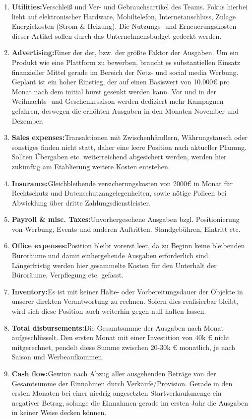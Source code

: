 \documentclass[11pt,a4paper]{report}
\begin{document}
\begin{enumerate}
    \item \textbf{Utilities:}\quad Verschleiß und Ver- und Gebrauchsartikel des Teams. Fokus hierbei lieht auf elektronischer Hardware, Mobiltelefon, Internetanschluss, Zulage Energiekosten (Strom \& Heizung). Die Nutzungs- und Erneuerungskosten dieser Artikel sollen durch das Unternehmensbudget gedeckt werden.
    \item \textbf{Advertising:}\quad Einer der der, bzw. der größte Faktor der Ausgaben. Um ein Produkt wie eine Plattform zu bewerben, braucht es substantiellen Einsatz finanzieller Mittel gerade im Bereich der Netz- und social media Werbung. Geplant ist ein hoher Einstieg, der auf einen Basiswert von 10.000€ pro Monat nach dem initial burst gesenkt werden kann. Vor und in der Weihnachts- und Geschenkesaison werden dediziert mehr Kampagnen gefahren, deswegen die erhöhten Ausgaben in den Monaten November und Dezember.
    \item \textbf{Sales expenses:}\quad Transaktionen mit Zwischenhändlern, Währungstausch oder sonstiges finden nicht statt, daher eine leere Position nach aktueller Planung. Sollten Übergaben etc. weiterreichend abgesichert werden, werden hier zukünftig am Etablierung weitere Kosten entstehen.
    \item \textbf{Insurance:}\quad Gleichbleibende versicherungskosten von 2000€ in Monat für Rechtschutz und Datenschutzangelegenheiten, sowie nötige Policen bei Abwicklung über dritte Zahlungsdienstleister.
    \item \textbf{Payroll \& misc. Taxes:}\quad Unvorhergesehene Ausgaben bzgl. Positionierung von Werbung, Events und anderen Auftritten. Standgebühren, Eintritt etc.
    \item \textbf{Office expenses:}\quad Position bleibt vorerst leer, da zu Beginn keine bleibenden Büroräume und damit einhergehende Ausgaben erforderlich sind. Längerfristig werden hier gesammelte Kosten für den Unterhalt der Büroräume, Verpflegung etc. gefasst.
    \item \textbf{Inventory:}\quad Es ist mit keiner Halte- oder Vorbereitungsdauer der Objekte in unserer direkten Verantwortung zu rechnen. Sofern dies realisierbar bleibt, wird sich diese Position auch weiterhin gegen null halten lassen.
    \item \textbf{Total disbursements:}\quad Die Gesamtsumme der Ausgaben nach Monat aufgeschlüsselt. Den ersten Monat mit einer Investition von 40k € nicht mitgerechnet, pendelt diese Summe zwischen 20-30k € monatlich, je nach Saison und Werbeaufkommen.
    \item \textbf{Cash flow:}\quad Gewinn nach Abzug aller ausgehenden Beträge von der Gesamtsumme der Einnahmen durch Verkäufe/Provision. Gerade in den ersten Monaten bei einer niedrig angesetzten Startverkaufsmenge ein negativer Betrag, solange die Einnahmen gerade im ersten Jahr die Ausgaben in keiner Weise decken können.

\end{enumerate}
\end{document}
